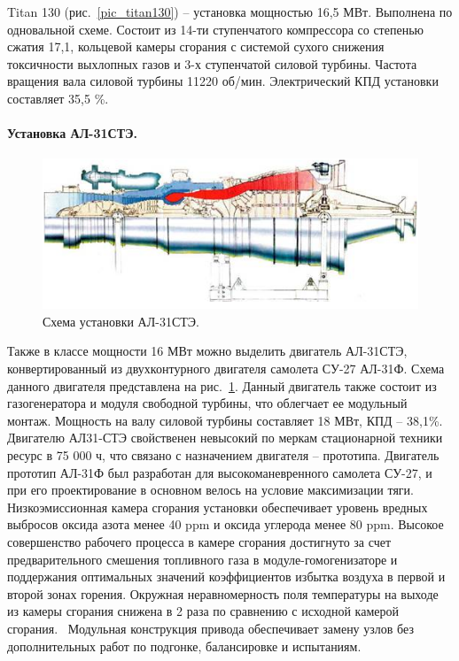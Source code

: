 \documentclass[a4paper,12pt]{article}
\begin{document}
    Titan 130 (рис.~\ref{pic_titan130}) – установка мощностью 16,5 МВт.
    Выполнена по одновальной схеме.
    Состоит из 14-ти ступенчатого компрессора со степенью сжатия 17,1, кольцевой камеры сгорания с
    системой сухого снижения токсичности выхлопных газов и 3-х ступенчатой силовой турбины.
    Частота вращения вала силовой турбины 11220 об/мин.
    Электрический КПД установки составляет 35,5 \%.~\cite{titan130}

    \paragraph{Установка АЛ-31СТЭ.}

    \begin{figure}[h!]
        \centering
        \includegraphics[scale=1.0]{./pictures/AL-31ST.png}
        \caption{Схема установки АЛ-31СТЭ.}
        \label{pic_al_31st}
    \end{figure}

    Также в классе мощности 16 МВт можно выделить двигатель АЛ-31СТЭ,
    конвертированный из двухконтурного двигателя самолета СУ-27 АЛ-31Ф.
    Схема данного двигателя представлена на рис.~\ref{pic_al_31st}.
    Данный двигатель также состоит из газогенератора и модуля свободной турбины, что облегчает ее модульный монтаж.
    Мощность на валу силовой турбины составляет 18 МВт, КПД – 38,1\%.
    Двигателю АЛ31-СТЭ свойственен невысокий по меркам стационарной техники ресурс в 75 000 ч, что
    связано с назначением двигателя – прототипа.
    Двигатель прототип АЛ-31Ф был разработан для высокоманевренного самолета СУ-27, и при его проектирование
    в основном велось на условие максимизации тяги.
    Низкоэмиссионная камера сгорания установки обеспечивает уровень вредных выбросов оксида азота
    менее 40 ppm и оксида углерода менее 80 ppm.
    Высокое совершенство рабочего процесса в камере сгорания достигнуто за счет предварительного
    смешения топливного газа в модуле-гомогенизаторе и поддержания оптимальных значений коэффициентов
    избытка воздуха в первой и второй зонах горения. Окружная неравномерность поля температуры на выходе из
    камеры сгорания снижена в 2 раза по сравнению с исходной камерой сгорания.~\cite{al-31st}
    Модульная конструкция привода обеспечивает замену узлов без
    дополнительных работ по подгонке, балансировке и испытаниям.~\cite{al-31st}
\end{document}
